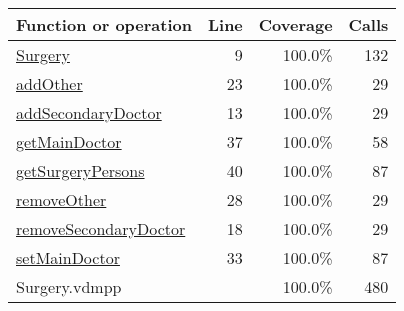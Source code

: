 \begin{longtable}{|l|r|r|r|}
\hline
Function or operation & Line & Coverage & Calls \\
\hline
\hline
\hyperref[Surgery:9]{Surgery} & 9&100.0\% & 132 \\
\hline
\hyperref[addOther:23]{addOther} & 23&100.0\% & 29 \\
\hline
\hyperref[addSecondaryDoctor:13]{addSecondaryDoctor} & 13&100.0\% & 29 \\
\hline
\hyperref[getMainDoctor:37]{getMainDoctor} & 37&100.0\% & 58 \\
\hline
\hyperref[getSurgeryPersons:40]{getSurgeryPersons} & 40&100.0\% & 87 \\
\hline
\hyperref[removeOther:28]{removeOther} & 28&100.0\% & 29 \\
\hline
\hyperref[removeSecondaryDoctor:18]{removeSecondaryDoctor} & 18&100.0\% & 29 \\
\hline
\hyperref[setMainDoctor:33]{setMainDoctor} & 33&100.0\% & 87 \\
\hline
\hline
Surgery.vdmpp & & 100.0\% & 480 \\
\hline
\end{longtable}


